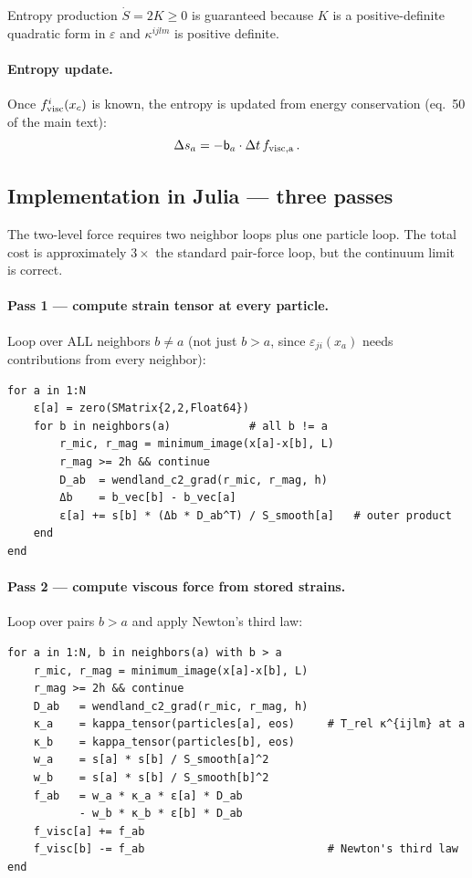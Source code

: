 \documentclass[12pt,aps,preprint,nofootinbib,noshowkeys,noshowpacs,longbibliography,superscriptaddress,tightenlines]{revtex4-2}
\def\bbeta{{\sf b}}
\begin{document}
Entropy production $\dot S = 2K \geq 0$ is guaranteed because $K$ is a
positive-definite quadratic form in $\varepsilon$ and $\kappa^{ijlm}$ is
positive definite.

\paragraph{Entropy update.}
Once $f^i_{\rm visc}(x_c)$ is known, the entropy is updated from energy
conservation (eq.~50 of the main text):
\begin{equation}
\label{eq:entropy_update}
    \Delta s_a = -\bbeta_a \cdot \Delta t\, f_{\rm visc,a} \,.
\end{equation}

\subsection*{Implementation in Julia — three passes}

The two-level force requires two neighbor loops plus one particle loop.
The total cost is approximately $3\times$ the standard pair-force loop,
but the continuum limit is correct.

\paragraph{Pass 1 — compute strain tensor at every particle.}
Loop over ALL neighbors $b \neq a$ (not just $b > a$, since
$\varepsilon_{ji}(x_a)$ needs contributions from every neighbor):
\begin{lstlisting}
for a in 1:N
    ε[a] = zero(SMatrix{2,2,Float64})
    for b in neighbors(a)            # all b != a
        r_mic, r_mag = minimum_image(x[a]-x[b], L)
        r_mag >= 2h && continue
        D_ab  = wendland_c2_grad(r_mic, r_mag, h)
        Δb    = b_vec[b] - b_vec[a]
        ε[a] += s[b] * (Δb * D_ab^T) / S_smooth[a]   # outer product
    end
end
\end{lstlisting}

\paragraph{Pass 2 — compute viscous force from stored strains.}
Loop over pairs $b > a$ and apply Newton's third law:
\begin{lstlisting}
for a in 1:N, b in neighbors(a) with b > a
    r_mic, r_mag = minimum_image(x[a]-x[b], L)
    r_mag >= 2h && continue
    D_ab   = wendland_c2_grad(r_mic, r_mag, h)
    κ_a    = kappa_tensor(particles[a], eos)     # T_rel κ^{ijlm} at a
    κ_b    = kappa_tensor(particles[b], eos)
    w_a    = s[a] * s[b] / S_smooth[a]^2
    w_b    = s[a] * s[b] / S_smooth[b]^2
    f_ab   = w_a * κ_a * ε[a] * D_ab
           - w_b * κ_b * ε[b] * D_ab
    f_visc[a] += f_ab
    f_visc[b] -= f_ab                            # Newton's third law
end
\end{lstlisting}
\end{document}
